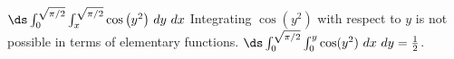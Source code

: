 {$\ds \int_0^{\sqrt{\pi/2}}\int_{x}^{\sqrt{\pi/2}} \cos\big(y^2\big)\ dy\ dx$
}
{Integrating $\cos(y^2)$ with respect to $y$ is not possible in terms of elementary functions. $\ds  \int_0^{\sqrt{\pi/2}}\int_0^{y}\cos(y^2)\ dx\ dy = \frac12$.
}